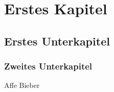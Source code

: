 
\chapter{Erstes Kapitel}                %
\section{Erstes Unterkapitel}           %
\subsection{Zweites Unterkapitel}       %

Affe
Bieber